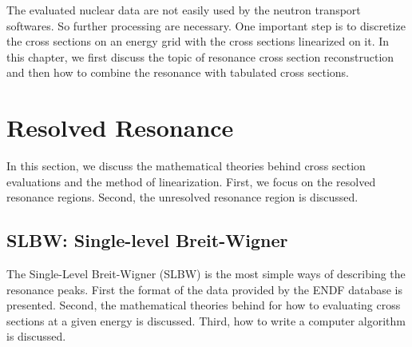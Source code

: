 The evaluated nuclear data are not easily used by the neutron transport softwares. So further processing are necessary. One important step is to discretize the cross sections on an energy grid with the cross sections linearized on it. In this chapter, we first discuss the topic of resonance cross section reconstruction and then how to combine the resonance with tabulated cross sections.

\section{Resolved Resonance}
In this section, we discuss the mathematical theories behind cross section evaluations and the method of linearization. First, we focus on the resolved resonance regions. Second, the unresolved resonance region is discussed. 

\subsection{SLBW: Single-level Breit-Wigner}
The Single-Level Breit-Wigner (SLBW) is the most simple ways of describing the resonance peaks. First the format of the data provided by the ENDF database is presented. Second, the mathematical theories behind for how to evaluating cross sections at a given energy is discussed. Third, how to write a computer algorithm is discussed.


